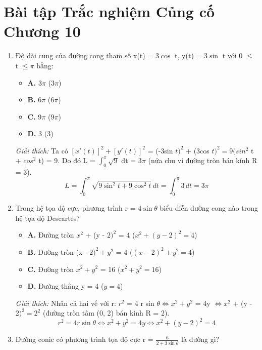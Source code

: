 \documentclass[11pt,a4paper,oneside]{book}
\begin{document}
\section{Bài tập Trắc nghiệm Củng cố Chương 10}
\begin{enumerate}[label=\textbf{Câu \arabic*:}, leftmargin=2.2em, itemsep=8pt]
  \item Độ dài cung của đường cong tham số x(t) = 3$\cos$ t, y(t) = 3$\sin$ t với 0 $\le$ t $\le \pi$ bằng:
  \begin{itemize}[label={}, leftmargin=1em, itemsep=2pt]
    \item \textbf{A.} 3$\pi$  \quad ($3\pi$)
    \item \textbf{B.} 6$\pi$  \quad ($6\pi$)
    \item \textbf{C.} 9$\pi$  \quad ($9\pi$)
    \item \textbf{D.} 3 \quad ($3$)
  \end{itemize}
  \vspace{2pt}
   \textit{Giải thích:} Ta có $[x'(t)]^2 + [y'(t)]^2$ = (-3sin $t)^2$ + (3cos $t)^2 = 9(sin^2$ t + $cos^2$ t) = 9. Do đó L = $\int_0^\pi \sqrt{9}$ dt = 3$\pi$  (nửa chu vi đường tròn bán kính R = 3).
  \[ L = \int_0^\pi \sqrt{9\sin^2 t + 9\cos^2 t}\,dt = \int_0^\pi 3\,dt = 3\pi \]
  \item Trong hệ tọa độ cực, phương trình r = 4$\sin \theta$ biểu diễn đường cong nào trong hệ tọa độ Descartes?
  \begin{itemize}[label={}, leftmargin=1em, itemsep=2pt]
    \item \textbf{A.} Đường tròn $x^2$ + (y - $2)^2$ = 4 \quad ($x^2 + (y - 2)^2 = 4$)
    \item \textbf{B.} Đường tròn (x - $2)^2 + y^2$ = 4 \quad ($(x - 2)^2 + y^2 = 4$)
    \item \textbf{C.} Đường tròn $x^2 + y^2$ = 16 \quad ($x^2 + y^2 = 16$)
    \item \textbf{D.} Đường thẳng y = 4 \quad ($y = 4$)
  \end{itemize}
  \vspace{2pt}
   \textit{Giải thích:} Nhân cả hai vế với r: $r^2$ = 4 r sin $\theta \iff x^2 + y^2$ = 4y $\iff x^2$ + (y - $2)^2 = 2^2$ (đường tròn tâm (0, 2) bán kính R = 2).
  \[ r^2 = 4r\sin\theta \iff x^2 + y^2 = 4y \iff x^2 + (y - 2)^2 = 4 \]
  \item Đường conic có phương trình tọa độ cực r = $\frac{6}{2 + 3\sin\theta}$ là đường gì?
  \begin{itemize}[label={}, leftmargin=1em, itemsep=2pt]

\end{itemize}
\end{enumerate}
\end{document}
